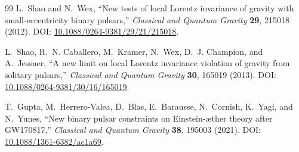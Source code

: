 \begin{thebibliography}{99}
L.~Shao and N.~Wex,
``New tests of local Lorentz invariance of gravity with small-eccentricity binary pulsars,''
\emph{Classical and Quantum Gravity} \textbf{29}, 215018 (2012).
DOI: \href{https://doi.org/10.1088/0264-9381/29/21/215018}{10.1088/0264-9381/29/21/215018}.

L.~Shao, R.~N. Caballero, M.~Kramer, N.~Wex, D.~J. Champion, and A.~Jessner,
``A new limit on local Lorentz invariance violation of gravity from solitary pulsars,''
\emph{Classical and Quantum Gravity} \textbf{30}, 165019 (2013).
DOI: \href{https://doi.org/10.1088/0264-9381/30/16/165019}{10.1088/0264-9381/30/16/165019}.

T.~Gupta, M.~Herrero-Valea, D.~Blas, E.~Barausse, N.~Cornish, K.~Yagi, and N.~Yunes,
``New binary pulsar constraints on Einstein-\ae ther theory after GW170817,''
\emph{Classical and Quantum Gravity} \textbf{38}, 195003 (2021).
DOI: \href{https://doi.org/10.1088/1361-6382/ac1a69}{10.1088/1361-6382/ac1a69}.

\end{thebibliography}
\fi
